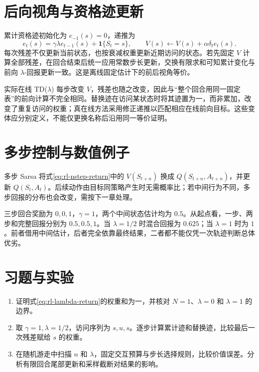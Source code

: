\documentclass[UTF8,12pt,a4paper,fontset=fandol]{ctexbook}
\begin{document}
\section{后向视角与资格迹更新}

累计资格迹初始化为 $e_{-1}(s)=0$，递推为
\[
e_t(s)=\gamma\lambda e_{t-1}(s)+\mathbf1\{S_t=s\},\qquad
V(s)\leftarrow V(s)+\alpha\delta_t e_t(s).
\]
每次残差不仅更新当前状态，也按衰减权重更新近期访问的状态。若先固定 $V$ 计算全部残差，在回合结束后统一应用常数步长更新，交换有限求和可知累计变化与前向 $\lambda$-回报更新一致。这是离线固定估计下的前后视角等价。

实际在线 TD($\lambda$) 每步改变 $V$，残差也随之改变，因此与“整个回合用同一固定表”的前向计算不完全相同。替换迹在访问某状态时将其迹置为一，而非累加，改变了重复访问的权重；真在线方法采用修正递推以匹配相应在线前向目标。这些变体应分别定义，不能仅更换名称后沿用同一等价证明。

\section{多步控制与数值例子}

多步 Sarsa 将式\eqref{eq:rl-nstep-return}中的 $V(S_{t+n})$ 换成 $Q(S_{t+n},A_{t+n})$，并更新 $Q(S_t,A_t)$。后续动作由目标同策略产生时无需概率比；若中间行为不同，多步回报的分布也会改变，需按下一章处理。

\begin{example}[混合三种时间跨度]
三步回合奖励为 $0,0,1$，$\gamma=1$，两个中间状态估计均为 $0.5$。从起点看，一步、两步和完整回报分别为 $0.5,0.5,1$。当 $\lambda=1/2$ 时混合回报为 $0.625$；当 $\lambda=1$ 时为 $1$。前者借用中间估计，后者完全依靠最终结果，二者都不能仅凭一次轨迹判断总体优劣。
\end{example}

\section{习题与实验}
\begin{enumerate}
\item 证明式\eqref{eq:rl-lambda-return}的权重和为一，并核对 $N=1$、$\lambda=0$ 和 $\lambda=1$ 的边界。
\item 取 $\gamma=1,\lambda=1/2$，访问序列为 $s,u,s$。逐步计算累计迹和替换迹，比较最后一次残差赋给 $s$ 的权重。
\item 在随机游走中扫描 $n$ 和 $\lambda$，固定交互预算与步长选择规则，比较价值误差。分析有限回合尾部更新和采样截断对结果的影响。
\end{enumerate}
\end{document}
